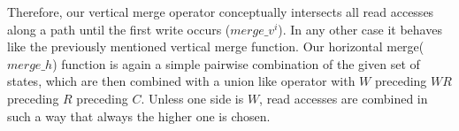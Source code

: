 Therefore, our vertical merge operator conceptually intersects all read accesses along a path until the first write 
occurs ($merge\_v^{i}$). In any other case it behaves like the previously mentioned vertical merge function.
Our horizontal merge($merge\_h$) function is again a simple pairwise combination of the given set of states, which are then combined with a union 
like operator with $W$ preceding $WR$ preceding $R$ preceding $C$. Unless one side is $W$, read accesses are combined in such a way that always the higher one is chosen.

%

